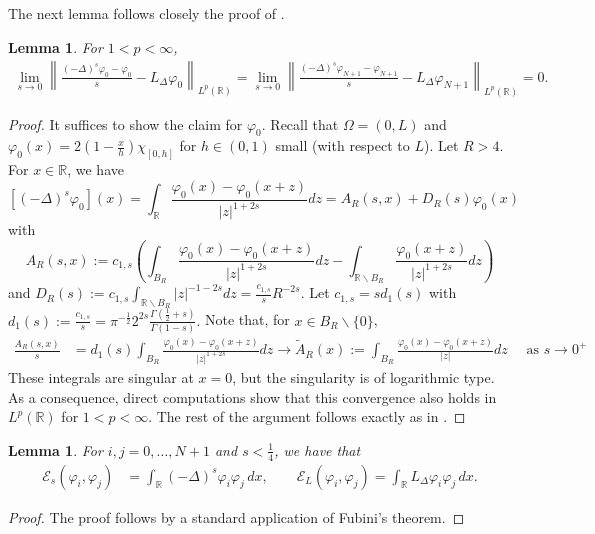 \documentclass[10 pt]{article}
\newtheorem{lemma}[theorem]{Lemma}
\numberwithin{equation}{section}
\def\tilde{\widetilde}
\def\R{\mathbb{R}}
\def\cE{\mathcal{E}}
\begin{document}
The next lemma follows closely the proof of \cite[Theorem 1.1]{CW19}.
\begin{lemma}\label{phi0:conv}
For $1<p<\infty$,
\begin{align*}
\lim_{s\to 0}\left\|\frac{(-\Delta)^s \varphi_0-\varphi_0}{s}-L_\Delta \varphi_0    \right\|_{L^p(\R)}
=\lim_{s\to 0}\left\|\frac{(-\Delta)^s \varphi_{N+1}-\varphi_{N+1}}{s}-L_\Delta \varphi_{N+1}    \right\|_{L^p(\R)}
=0.
\end{align*}
\end{lemma}
\begin{proof}
It suffices to show the claim for $\varphi_0$. Recall that $\Omega=(0,L)$ and $\varphi_0(x)=2(1-\frac{x}{h})\chi_{[0,h]}$ for $h\in(0,1)$ small (with respect to $L$).  Let $R>4.$  For $x \in \mathbb{R}$, we have
$$
\left[(-\Delta)^s \varphi_0\right](x)=\int_{\mathbb{R}} \frac{\varphi_0(x)-\varphi_0(x+z)}{|z|^{1+2s}} d z=A_R(s, x)+D_R(s) \varphi_0(x)
$$
with
$$
A_R(s, x):=c_{1, s}\left(\int_{B_R} \frac{\varphi_0(x)-\varphi_0(x+z)}{|z|^{1+2 s}} d z-\int_{\mathbb{R} \backslash B_R} \frac{\varphi_0(x+z)}{|z|^{1+2s}} d z\right)
$$
and $D_R(s):=c_{1, s} \int_{\mathbb{R} \backslash B_R}|z|^{-1-2 s} d z=\frac{c_{1, s}}{s}R^{-2 s}.$ Let $c_{1, s}=s d_1(s)$ with $d_1(s):=\frac{c_{1, s}}{s}=\pi^{-\frac{1}{2}} 2^{2 s} \frac{\Gamma\left(\frac{1}{2}+s\right)}{\Gamma(1-s)}.$  Note that, for $x\in B_R\backslash \{0\}$,
\begin{align*}
\frac{A_R(s, x)}{s} & =d_1(s) \int_{B_R} \frac{\varphi_0(x)-\varphi_0(x+z)}{|z|^{1+2 s}} d z
\rightarrow \tilde{A}_R(x):=\int_{B_R} \frac{\varphi_0(x)-\varphi_0(x+z)}{|z|} d z \quad \text { as } s \rightarrow 0^{+}
\end{align*}
These integrals are singular at $x=0$, but the singularity is of logarithmic type.  As a consequence, direct computations show that this convergence also holds in $L^p(\R)$ for $1<p<\infty$.  The rest of the argument follows exactly as in \cite[Theorem 1.1]{CW19}.
\end{proof}

\begin{lemma}\label{ibyp:lem}
For $i,j=0,\ldots,N+1$ and $s<\frac{1}{4}$, we have that
\begin{align*}
    \cE_s(\varphi_i,\varphi_j)&=\int_{\R}(-\Delta)^s\varphi_i\varphi_j\, dx,\qquad \cE_L(\varphi_i,\varphi_j)=\int_{\R}L_\Delta\varphi_i\varphi_j\, dx.
\end{align*}
\end{lemma}
\begin{proof}The proof follows by a standard application of Fubini's theorem. 
\end{proof}
\end{document}
